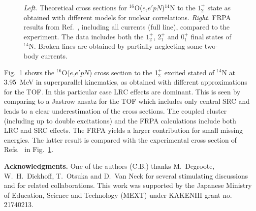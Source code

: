 \documentclass{ws-mpla}
\begin{document}
\begin{figure}[h]
\centerline{\hspace*{5pt}   
            \hspace*{18pt} }
\caption{\label{fig_pn}
{\em Left.} Theoretical cross sections for $^{16}$O($e$,$e'pN$)$^{14}$N
to the $1^+_2$ state as obtained with different models for nuclear
correlations.\cite{giu.07,giu.99,bar.04a}
{\em Right.} FRPA results from Ref.~, including
all currents (full line), compared to the experiment.\cite{exp.PN}
The data includes both the $1^+_2$, $2^+_1$ and $0^+_1$ final
states of $^{14}$N. Broken lines are obtained by partially neglecting
some two-body currents.\cite{giu.07,exp.PN} }
\end{figure}


Fig.~\ref{fig_pn} shows the $^{16}$O($e$,$e'pN$) cross section to the 1$^+_2$ excited stated
of $^{14}$N at 3.95~MeV in superparallel kinematics, as obtained with different
approximations for the TOF.
%
In this particular case LRC effects are dominant. This is seen by comparing to a Jastrow
ansatz for the TOF which includes only central SRC and leads to a clear underestimation
of the cross sections.
 The coupled cluster (including up to double excitations)\cite{giu.99} and
the FRPA\cite{bar.04a} calculations include both LRC and SRC effects. The FRPA 
yields a larger contribution for small missing energies. The latter result is compared
with the experimental cross section of Refs.~ in Fig.~\ref{fig_pn}.


\vspace*{.5cm}



{\bf Acknowledgments.}
One of the authors (C.B.) thanks M.~Degroote, W.~H.~Dickhoff, T.~Otsuka and D.~Van Neck for several stimulating discussions and for related collaborations.
This work was supported by the Japanese Ministry of Education, Science and Technology (MEXT) under KAKENHI grant no. 21740213.
\end{document}
